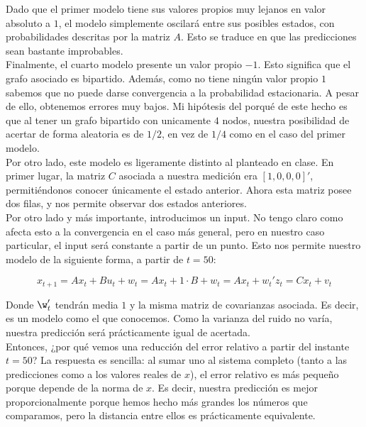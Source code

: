 \documentclass[a4paper]{article}
\begin{document}
Dado que el primer modelo tiene sus valores propios muy lejanos en valor absoluto a $1$, el modelo simplemente oscilará entre sus posibles estados, con probabilidades descritas por la matriz $A$. Esto se traduce en que las predicciones sean bastante improbables.\\

Finalmente, el cuarto modelo presente un valor propio $-1$. Esto significa que el grafo asociado es bipartido. Además, como no tiene ningún valor propio $1$ sabemos que no puede darse convergencia a la probabilidad estacionaria. A pesar de ello, obtenemos errores muy bajos. Mi hipótesis del porqué de este hecho es que al tener un grafo bipartido con unicamente $4$ nodos, nuestra posibilidad de acertar de forma aleatoria es de $1/2$, en vez de $1/4$ como en el caso del primer modelo. \\

Por otro lado, este modelo es ligeramente distinto al planteado en clase. En primer lugar, la matriz $C$ asociada a nuestra medición era $[1,0,0,0]'$, permitiéndonos conocer únicamente el estado anterior. Ahora esta matriz posee dos filas, y nos permite observar dos estados anteriores. \\

Por otro lado y más importante, introducimos un input. No tengo claro como afecta esto a la convergencia en el caso más general, pero en nuestro caso particular, el input será constante a partir de un punto. Esto nos permite nuestro modelo de la siguiente forma, a partir de $t=50$:

\[
	x_{t+1} = A x_t + B u_t + w_t = A x_t + 1 \cdot B + w_t = A x_t + w_t'
	z_t = C x_t + v_t
\]

Donde $\w_t'$ tendrán media $1$ y la misma matriz de covarianzas asociada. Es decir, es un modelo como el que conocemos. Como la varianza del ruido no varía, nuestra predicción será prácticamente igual de acertada. \\

Entonces, ¿por qué vemos una reducción del error relativo a partir del instante $t=50$? La respuesta es sencilla: al sumar uno al sistema completo (tanto a las predicciones como a los valores reales de $x$), el error relativo es más pequeño porque depende de la norma de $x$. Es decir, nuestra predicción es mejor proporcionalmente porque hemos hecho más grandes los números que comparamos, pero la distancia entre ellos es prácticamente equivalente.
\end{document}
